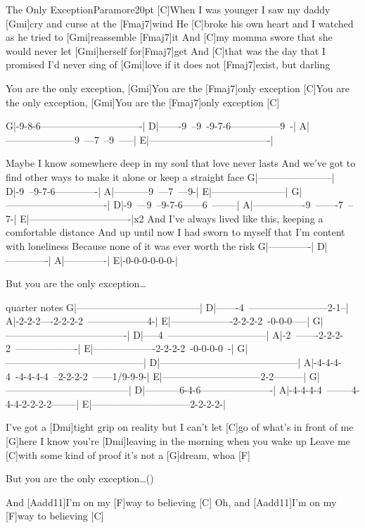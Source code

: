\begin{song}{The Only Exception}{Paramore}{20pt}
%
[C]When I was younger I saw my daddy [Gmi]cry and curse at the [Fmaj7]wind
He [C]broke his own heart and I watched as he tried to [Gmi]reassemble [Fmaj7]it
And [C]my momma swore that she would never let [Gmi]herself for[Fmaj7]get
And [C]that was the day that I promised I'd never sing of [Gmi]love
if it does not [Fmaj7]exist, but darling

\chorus%
[C]You are the only exception, [Gmi]You are the [Fmaj7]only exception
[C]You are the only exception, [Gmi]You are the [Fmaj7]only exception [C]{}

\tabs{80pt}
G|-9-8-6-------------------------------|
D|-------9~--9~-9-7-6---------------9~-|
A|---------------------9~---7~--9~-----|
E|-------------------------------------|
\endtabs

%
Maybe I know somewhere deep in my soul that love never lasts
And we've got to find other ways to make it alone or keep a straight face
\tabs{80pt}
G|-----------------------|
D|-9~--9-7-6-------------|
A|-----------9~---7~---9-|
E|-----------------------|
\endtabs
\tabs{80pt}
G|-------------------------------|
D|-9~---9~--9-7-6------6~--------|
A|----------------9~-------7~--7-|
E|-------------------------------|x2
\endtabs
And I've always lived like this, keeping a comfortable distance
And up until now I had sworn to myself that I'm content with loneliness
Because none of it was ever worth the risk
\tabs{80pt}
G|-------------|
D|-------------|
A|-------------|
E|-0-0-0-0-0-0-|
\endtabs

\chorus But you are the only exception\dots

\tabs{50pt}
quarter notes
G|--------------------------------------|
D|-------4~------------------------2-1--|
A|-2-2-2----2-2-2-2~------------------4-|
E|-------------------2-2-2-2~-0-0-0-----|
\endtabs
\tabs{50pt}
G|-------------------------------------|
D|-----4~------------------------------|
A|-2~-------2-2-2-2~-------------------|
E|-------------------2-2-2-2~-0-0-0-0~-|
\endtabs
\tabs{50pt}
G|------------------------------------------|
D|------------------------------------------|
A|-4-4-4-4~-4-4-4-4~--2-2-2-2~------1/9-9-9-|
E|------------------------------2-2---------|
\endtabs
\tabs{50pt}
G|--------------------------------------|
D|-----------6-4-6----------------------|
A|-4-4-4-4~--------4-4-4-2-2-2-2--------|
E|------------------------------2-2-2-2-|
\endtabs

\verse{*}%
I've got a [Dmi]tight grip on reality but I can't 
let [C]go of what's in front of me [G]here
I know you're [Dmi]leaving in the morning when you wake up
Leave me [C]with some kind of proof it's not a [G]dream, whoa [F]{}

\chorus But you are the only exception\dots ()

\verse{*}%
And [Aadd11]I'm on my [F]way to believing [C]{}
Oh, and [Aadd11]I'm on my [F]way to believing [C]{}
\end{song}
